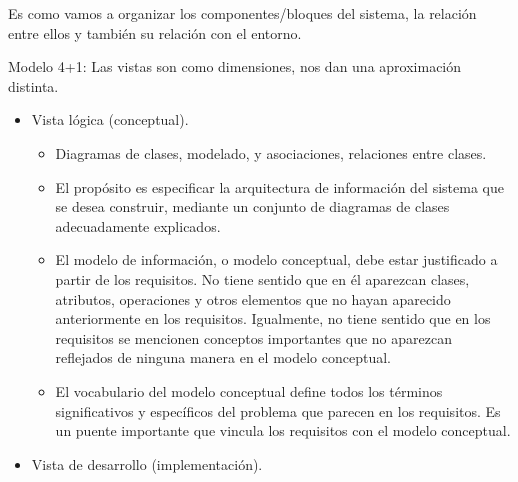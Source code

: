 \documentclass[12pt, twoside, openright]{report} %
\begin{document}
Es como vamos a organizar los componentes/bloques del sistema, la
relación entre ellos y también su relación con el entorno.

Modelo 4+1: Las vistas son como dimensiones, nos dan una
aproximación distinta.

\begin{itemize}
    \item Vista lógica (conceptual).
		\begin{itemize}
			
			\item
				Diagramas de clases, modelado, y asociaciones, relaciones entre
				clases.
			\item
				El propósito es especificar la arquitectura de información del
				sistema que se desea construir, mediante un conjunto de
				diagramas de clases adecuadamente explicados.
			\item
				El modelo de información, o modelo conceptual, debe estar
				justificado a partir de los requisitos. No tiene sentido que en
				él aparezcan clases, atributos, operaciones y otros elementos
				que no hayan aparecido anteriormente en los requisitos.
				Igualmente, no tiene sentido que en los requisitos se mencionen
				conceptos importantes que no aparezcan reflejados de ninguna
				manera en el modelo conceptual.
			\item
				El vocabulario del modelo conceptual define todos los términos
				significativos y específicos del problema que parecen en los
				requisitos. Es un puente importante que vincula los requisitos
				con el modelo conceptual.
		\end{itemize}
    \item Vista de desarrollo (implementación).
    	\begin{itemize}
      

\end{itemize}
\end{itemize}
\end{document}
